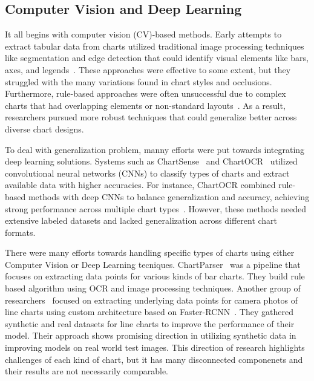 \documentclass[
	letterpaper, %
]{jdf}
\begin{document}
\subsection{Computer Vision and Deep Learning}\label{ssect:cv-and-dl}
    It all begins with computer vision (CV)-based methods.
    Early attempts to extract tabular data from charts utilized traditional image processing techniques like segmentation and edge detection that could identify visual elements like bars, axes, and legends~\cite{sreevalsan2021tensor}.
    These approaches were effective to some extent, but they struggled with the many variations found in chart styles and occlusions.
    Furthermore, rule-based approaches were often unsuccessful due to complex charts that had overlapping elements or non-standard layouts~\cite{poco2017reverse}.
    As a result, researchers pursued more robust techniques that could generalize better across diverse chart designs.

    To deal with generalization problem, manny efforts were put towards integrating deep learning solutions.
    Systems such as ChartSense~\cite{jung2017chartsense} and ChartOCR~\cite{luo2021chartocr} utilized convolutional neural networks (CNNs) to classify types of charts and extract available data with higher accuracies.
    For instance, ChartOCR combined rule-based methods with deep CNNs to balance generalization and accuracy, achieving strong performance across multiple chart types~\cite{luo2021chartocr}.
    However, these methods needed extensive labeled datasets and lacked generalization across different chart formats.

    There were many efforts towards handling specific types of charts using either Computer Vision or Deep Learning tecniques.
    ChartParser~\cite{kumar2022chartparser} was a pipeline that focuses on extracting data points for various kinds of bar charts.
    They build rule based algorithm using OCR and image processing techniques.
    Another group of researchers~\cite{li2022chart} focused on extracting underlying data points for camera photos of line charts using custom architecture based on Faster-RCNN~\cite{ren2015faster}.
    They gathered synthetic and real datasets for line charts to improve the performance of their model.
    Their approach shows promising direction in utilizing synthetic data in improving models on real world test images.
    This direction of research highlights challenges of each kind of chart, but it has many disconnected componenets and their results are not necessarily comparable.
\end{document}
